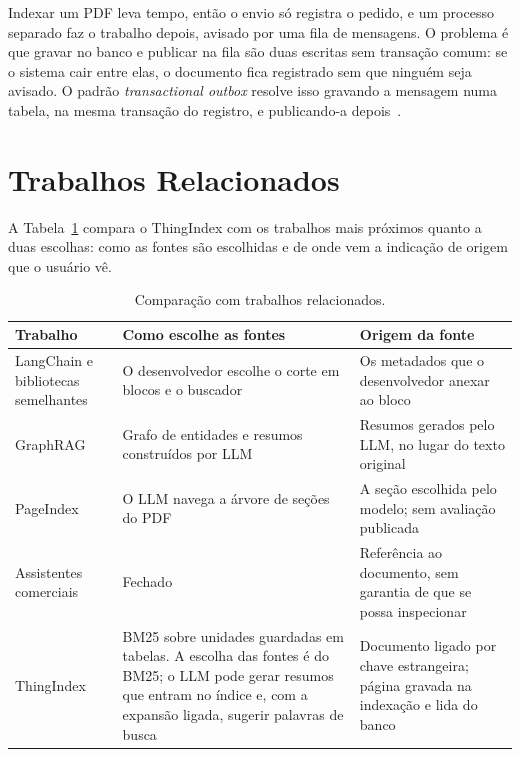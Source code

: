 \documentclass[12pt]{article}
\newcommand{\fonte}{\par\vspace{3pt}{\footnotesize Fonte: o autor.}\par}
\begin{document}
Indexar um PDF leva tempo, então o envio só registra o pedido, e um processo separado faz o trabalho depois, avisado por uma fila de mensagens. O problema é que gravar no banco e publicar na fila são duas escritas sem transação comum: se o sistema cair entre elas, o documento fica registrado sem que ninguém seja avisado. O padrão \emph{transactional outbox} resolve isso gravando a mensagem numa tabela, na mesma transação do registro, e publicando-a depois~\cite{richardson2018microservices}.

\section{Trabalhos Relacionados}
\label{sec:relacionados}

A Tabela~\ref{tab:relacionados} compara o ThingIndex com os trabalhos mais próximos quanto a duas escolhas: como as fontes são escolhidas e de onde vem a indicação de origem que o usuário vê.

\begin{table}[!htbp]
\centering
\caption{Comparação com trabalhos relacionados.}
\label{tab:relacionados}
\small
\begin{tabular}{>{\raggedright\arraybackslash}p{3.4cm}>{\raggedright\arraybackslash}p{4.7cm}>{\raggedright\arraybackslash}p{5.4cm}}
\toprule
Trabalho & Como escolhe as fontes & Origem da fonte \\
\midrule
LangChain \cite{langchain2022} e bibliotecas semelhantes & O desenvolvedor escolhe o corte em blocos e o buscador & Os metadados que o desenvolvedor anexar ao bloco \\
\cmidrule(lr){1-3}
GraphRAG \cite{edge2024graphrag} & Grafo de entidades e resumos construídos por LLM & Resumos gerados pelo LLM, no lugar do texto original \\
\cmidrule(lr){1-3}
PageIndex \cite{pageindex2025} & O LLM navega a árvore de seções do PDF & A seção escolhida pelo modelo; sem avaliação publicada \\
\cmidrule(lr){1-3}
Assistentes comerciais & Fechado & Referência ao documento, sem garantia de que se possa inspecionar \\
\cmidrule(lr){1-3}
ThingIndex & BM25 sobre unidades guardadas em tabelas. A escolha das fontes é do BM25; o LLM pode gerar resumos que entram no índice e, com a expansão ligada, sugerir palavras de busca & Documento ligado por chave estrangeira; página gravada na indexação e lida do banco \\
\bottomrule
\end{tabular}
\fonte
\end{table}
\end{document}

